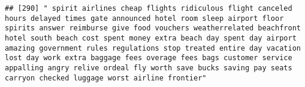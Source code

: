 \documentclass[
]{article}
\begin{document}
\begin{verbatim}
## [290] " spirit airlines cheap flights ridiculous flight canceled hours delayed times gate announced hotel room sleep airport floor spirits answer reimburse give food vouchers weatherrelated beachfront hotel south beach cost spent money extra beach day spent day airport amazing government rules regulations stop treated entire day vacation lost day work extra baggage fees overage fees bags customer service appalling angry relive ordeal fly worth save bucks saving pay seats carryon checked luggage worst airline frontier"                                                                                                                                                                                                                                                                                                                                                                                                                                                                                                                                                                                                                                                                                                                                                                                                                                                                                                                                                                                                                                                                                                                                                                                                                                                           

\end{verbatim}
\end{document}
